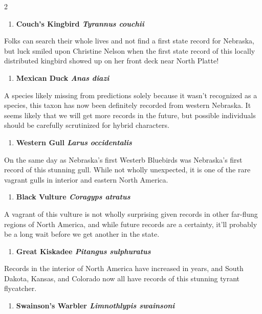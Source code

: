 \documentclass[10pt,letterpaper]{article}
\begin{document}
	\begin{multicols}{2}
	\begin{enumerate}[resume]
		\item \textbf{Couch’s Kingbird \textit{Tyrannus couchii}}
	\end{enumerate}
	Folks can search their whole lives and not find a first state record for Nebraska, but luck smiled upon Christine Nelson when the first state record of this locally distributed kingbird showed up on her front deck near North Platte!
	
	\begin{enumerate}[resume]
		\item \textbf{Mexican Duck \textit{Anas diazi}}
	\end{enumerate}
	A species likely missing from predictions solely because it wasn't recognized as a species, this taxon has now been definitely recorded from western Nebraska. It seems likely that we will get more records in the future, but possible individuals should be carefully scrutinized for hybrid characters.
	
	\begin{enumerate}[resume]
		\item \textbf{Western Gull \textit{Larus occidentalis}}
	\end{enumerate}
	On the same day as Nebraska's first Westerb Bluebirds was Nebraska's first record of this stunning gull. While not wholly unexpected, it is one of the rare vagrant gulls in interior and eastern North America.
	
	\begin{enumerate}[resume]
		\item \textbf{Black Vulture \textit{Coragyps atratus}}
		\end{enumerate}
		A vagrant of this vulture is not wholly surprising given records in other far-flung regions of North America, and while future records are a certainty, it'll probably be a long wait before we get another in the state.
		
		\begin{enumerate}[resume]
		\item \textbf{Great Kiskadee \textit{Pitangus sulphuratus}}
		\end{enumerate}
		Records in the interior of North America have increased in years, and South Dakota, Kansas, and Colorado now all have records of this stunning tyrant flycatcher.
		
		\begin{enumerate}[resume]
		\item \textbf{Swainson’s Warbler \textit{Limnothlypis swainsoni}}
		\end{enumerate}
		

\end{multicols}
\end{document}
